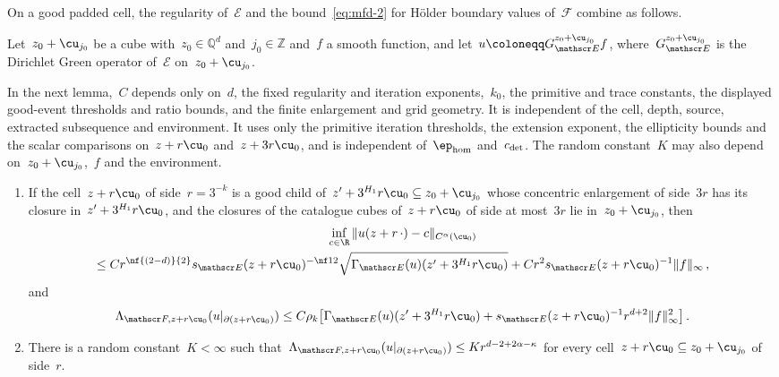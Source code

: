 \documentclass[11pt]{amsart}
\begin{document}
\smallskip

On a good padded cell, the regularity of~$\mathscr E$ and the bound~\eqref{eq:mfd-2} for H\"older boundary values of~$\mathscr F$ combine as follows.

Let~$z_0+\cu_{j_0}$ be a cube with~$z_0\in\mathbb Q^d$ and~$j_0\in\mathbb Z$ and~$f$ a smooth function, and let~$u\coloneqq G_{\mathscr E}^{z_0+\cu_{j_0}}f$, where~$G_{\mathscr E}^{z_0+\cu_{j_0}}$ is the Dirichlet Green operator of~$\mathscr E$ on~$z_0+\cu_{j_0}$.

In the next lemma,~$C$ depends only on~$d$, the fixed regularity and iteration exponents,~$k_0$, the primitive and trace constants, the displayed good-event thresholds and ratio bounds, and the finite enlargement and grid geometry. It is independent of the cell, depth, source, extracted subsequence and environment. It uses only the primitive iteration thresholds, the extension exponent, the ellipticity bounds and the scalar comparisons on~$z+r\cu_0$ and~$z+3r\cu_0$, and is independent of~$\ep_{\rm hom}$ and~$c_{\rm det}$. The random constant~$K$ may also depend on~$z_0+\cu_{j_0}$,~$f$ and the environment.

\begin{lemma}
\label{mfd:lem-goodext}
\begin{enumerate}[label=(\roman*),leftmargin=*]
\item If the cell~$z+r\cu_0$ of side~$r=3^{-k}$ is a good child of~$z'+3^{H_1}r\cu_0\subseteq z_0+\cu_{j_0}$ whose concentric enlargement of side~$3r$ has its closure in~$z'+3^{H_1}r\cu_0$, and the closures of the catalogue cubes of~$z+r\cu_0$ of side at most~$3r$ lie in~$z_0+\cu_{j_0}$, then
\begin{multline*}
	\inf_{c\in\R}\|u(z+r\,\cdot)-c\|_{C^\alpha(\cu_0)}
	\\
	\leq Cr^{\nf{(2-d)}{2}}s_{\mathscr E}(z+r\cu_0)^{-\nf12}\sqrt{\Gamma_{\mathscr E}(u)(z'+3^{H_1}r\cu_0)}
	+Cr^2s_{\mathscr E}(z+r\cu_0)^{-1}\|f\|_\infty\,,
\end{multline*}
and
\begin{equation*}
	\Lambda_{\mathscr F,z+r\cu_0}(u|_{\partial(z+r\cu_0)})
	\leq C\rho_k\bigl[\Gamma_{\mathscr E}(u)(z'+3^{H_1}r\cu_0)+s_{\mathscr E}(z+r\cu_0)^{-1}r^{d+2}\|f\|_\infty^2\bigr]\,.
\end{equation*}
\item There is a random constant~$K<\infty$ such that~$\Lambda_{\mathscr F,z+r\cu_0}(u|_{\partial(z+r\cu_0)})\leq Kr^{d-2+2\alpha-\kappa}$ for every cell~$z+r\cu_0\subseteq z_0+\cu_{j_0}$ of side~$r$.
\end{enumerate}
\end{lemma}
\end{document}
